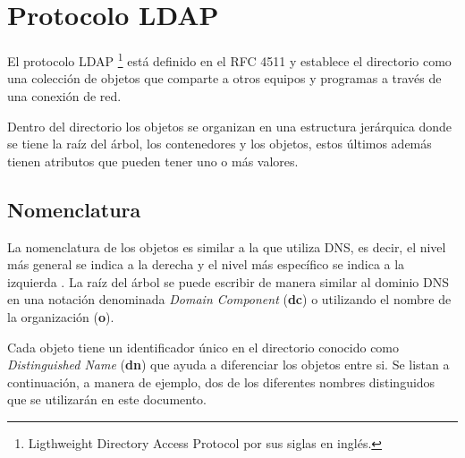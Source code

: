 \section {Protocolo \textsc{LDAP}}

El protocolo \textsc{LDAP} \footnote{Ligthweight Directory Access Protocol por sus siglas en ingl\'{e}s.} est\'{a} definido en el \textsc{RFC} 4511 \cite{_rfc_????-5} y establece el directorio como una colecci\'{o}n de objetos que comparte a otros equipos y programas a trav\'{e}s de una conexi\'{o}n de red.

Dentro del directorio los objetos se organizan en una estructura jer\'{a}rquica donde se tiene la ra\'{i}z del \'{a}rbol, los contenedores y los objetos, estos \'{u}ltimos adem\'{a}s tienen atributos que pueden tener uno o m\'{a}s valores.

  \subsection {Nomenclatura}

La nomenclatura de los objetos es similar a la que utiliza \textsc{DNS}, es decir, el nivel m\'{a}s general se indica a la derecha y el nivel m\'{a}s espec\'{i}fico se indica a la izquierda \cite{_appendix_????}. La ra\'{i}z del \'{a}rbol se puede escribir de manera similar al dominio \textsc{DNS} en una notaci\'{o}n denominada \textit{Domain Component} (\textbf{dc}) o utilizando el nombre de la organizaci\'{o}n (\textbf{o}).

{
 \begin{table}[H]
 \caption{Nomenclatura del nodo ra\'{i}z de \textsc{LDAP}}{}
 \label{tab:nomenclatura-ldap-root}
 \noindent{} %
 \end{table}
}

Cada objeto tiene un identificador \'{u}nico en el directorio conocido como \textit{Distinguished Name} (\textbf{dn}) que ayuda a diferenciar los objetos entre si. Se listan a continuaci\'{o}n, a manera de ejemplo, dos de los diferentes nombres distinguidos que se utilizar\'{a}n en este documento.

